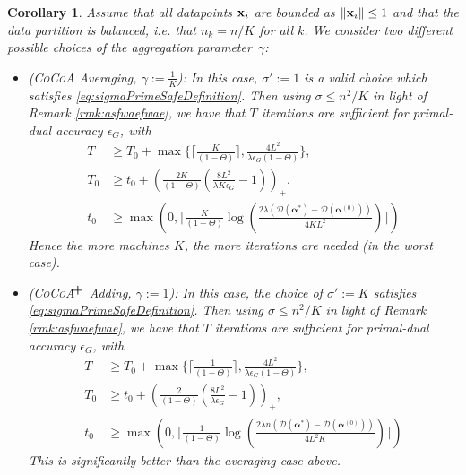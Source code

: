 \documentclass{article}
\newcommand{\cocoa}{\textsc{CoCoA}\xspace}
\newcommand{\cocoap}{\textsc{CoCoA$\!^{\bf \textbf{\footnotesize+}}$}\xspace}
\newcommand{\calG}{G}
\newcommand{\xv}{ {\bf x}}
\newcommand{\alphav}{ {\boldsymbol \alpha}}
\newcommand{\0}{ {\bf 0}}
\newcommand{\vc}[2]{#1^{(#2)}}                   %
\newcommand{\bD}{\mathcal{D}}
\theoremstyle{plain}
\newtheorem{corollary}[theorem]{Corollary}
\theoremstyle{definition}
\begin{document}
\begin{corollary}\label{cor:convergence}
Assume that 
all datapoints $\xv_i$ are bounded as $\|\xv_i\|\leq 1$
and that 
the data partition is balanced, i.e. that 
$n_k = n/K$ for all $k$.
We consider two different possible choices of the aggregation parameter~$\gamma$: \vspace{-1em}
\begin{itemize}
\item 
(\cocoa Averaging, $\gamma := \frac1K$):
In this case, $\sigma':=1$ is a valid choice which satisfies 
\eqref{eq:sigmaPrimeSafeDefinition}.
Then using $\sigma \le n^2/K$ in light of Remark \ref{rmk:asfwaefwae}, we have that $T$ iterations are sufficient for primal-dual accuracy $\epsilon_\calG$, with
\begin{align*}
T
&\geq
T_0 + 
\max\{\Big\lceil \frac K{ (1-\Theta)}\Big\rceil,\frac
{4L^2      }
{\lambda \epsilon_\calG
 (1-\Theta)}\},  
\\
T_0
&\geq t_0+
\left(
\frac{2 K}{  (1-\Theta) }
\left(
\frac
{8L^2       }
{\lambda K \epsilon_\calG}
-1
\right)
\right)_+,
\\
t_0 &\geq 
  \max(0,\big\lceil \tfrac K{ (1-\Theta)}
\log(
 \tfrac{2\lambda (\bD(\alphav^* )-\bD(\vc{\alphav}{0}))
  } {4 K L^2   }
  )
 \big\rceil) 
\end{align*}
Hence the more machines $K$, the more iterations are needed (in the worst case).

\item
(\cocoap Adding, $\gamma := 1$):
In this case, the choice of $\sigma':=K$ satisfies 
\eqref{eq:sigmaPrimeSafeDefinition}.
Then using $\sigma \le n^2/K$ in light of Remark \ref{rmk:asfwaefwae}, we have that $T$ iterations are sufficient for primal-dual accuracy $\epsilon_\calG$, 
with\begin{align*}
T
&\geq
T_0 + 
\max\{\Big\lceil \frac1{  (1-\Theta)}\Big\rceil,\frac
{4L^2  }
{\lambda  \epsilon_\calG
  (1-\Theta)}\},  
\\
T_0
&\geq t_0+
\left(
\frac{2}{   (1-\Theta) }
\left(
\frac
{8L^2   }
{\lambda  \epsilon_\calG}
-1
\right)
\right)_+,
\\
t_0 &\geq 
  \max(0,\big\lceil \tfrac1{  (1-\Theta)}
\log(
\tfrac{
 2\lambda n  (\bD(\alphav^* )-\bD(\vc{\alphav}{0}))
  }{4 L^2   K}
  )
 \big\rceil)
\end{align*}
This is significantly better than the averaging case above.
\end{itemize}
\end{corollary}
\vspace{-.5em}
\end{document}
